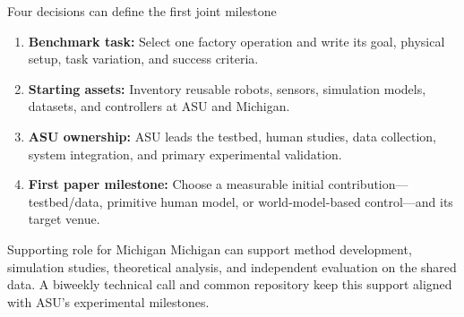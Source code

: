 \documentclass[aspectratio=169,11pt]{beamer}
\begin{document}
\begin{frame}{Four decisions can define the first joint milestone}
\begin{enumerate}
  \item \textbf{Benchmark task:} Select one factory operation and write its goal, physical setup, task variation, and success criteria.
  \vspace{0.16cm}
  \item \textbf{Starting assets:} Inventory reusable robots, sensors, simulation models, datasets, and controllers at ASU and Michigan.
  \vspace{0.16cm}
  \item \textbf{ASU ownership:} ASU leads the testbed, human studies, data collection, system integration, and primary experimental validation.
  \vspace{0.16cm}
  \item \textbf{First paper milestone:} Choose a measurable initial contribution---testbed/data, primitive human model, or world-model-based control---and its target venue.
\end{enumerate}
\vspace{0.12cm}
\begin{alertblock}{Supporting role for Michigan}
Michigan can support method development, simulation studies, theoretical analysis, and independent evaluation on the shared data. A biweekly technical call and common repository keep this support aligned with ASU's experimental milestones.
\end{alertblock}
\end{frame}
\end{document}
